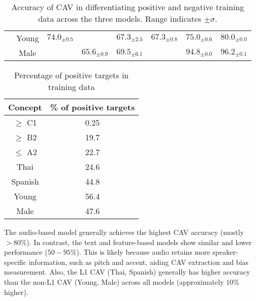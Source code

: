 \begin{table}[H]
\begin{tabular}{|c|c|cc|cc|cc|}
                          & Young                             & \multicolumn{1}{c|}{$74.0_{\pm 0.5}$}                     & \cellcolor{red!15}{$56.4_{\pm 0.3}$} & \multicolumn{1}{c|}{$67.3_{\pm 2.5}$}                     & $67.3_{\pm 0.8}$                     & \multicolumn{1}{c|}{$75.0_{\pm 0.6}$}                     & $80.0_{\pm 0.0}$ \\ \cline{2-8}
                          & Male                              & \multicolumn{1}{c|}{\cellcolor{red!15}{$59.2_{\pm 0.5}$}} & $65.6_{\pm 0.9}$                     & \multicolumn{1}{c|}{$69.5_{\pm 6.1}$}                     & \cellcolor{red!15}{$51.7_{\pm 9.1}$} & \multicolumn{1}{c|}{$94.8_{\pm 0.0}$}                     & $96.2_{\pm 0.1}$ \\ \hline
    \end{tabular}

    \caption{Accuracy of CAV in differentiating positive and negative training data across the three models. Range indicates $\pm \sigma$.}
    \label{tab:CAV_accuracy_combined}
\end{table}

\begin{table}[H]
    \centering
    \begin{tabular}{|c|c|}
        \hline
        \textbf{Concept} & \textbf{\% of positive targets} \\
        \hline
        $\geq$ C1        & 0.25                            \\
        $\geq$ B2        & 19.7                            \\
        $\leq$ A2        & 22.7                            \\ \hline
        Thai             & 24.6                            \\
        Spanish          & 44.8                            \\ \hline
        Young            & 56.4                            \\ \hline
        Male             & 47.6                            \\
        \hline
    \end{tabular}
    \caption{Percentage of positive targets in training data}
    \label{tab:pos_target}
\end{table}

The audio-based model generally achieves the highest CAV accuracy (mostly $> 80\%$). In contrast, the text and feature-based models show similar and lower performance ($50-95\%$). This is likely because audio retains more speaker-specific information, such as pitch and accent, aiding CAV extraction and bias measurement. Also, the L1 CAV (Thai, Spanish) generally has higher accuracy than the non-L1 CAV (Young, Male) across all models (approximately $10\%$ higher).

